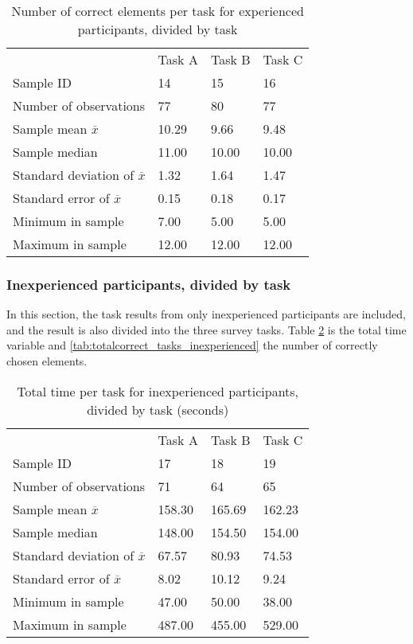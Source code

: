 \begin{table}[H]
	\centering
	\begin{tabular}{l|l|l|l}
		 & Task A & Task B & Task C \\ 
		Sample ID & 14 & 15  & 16   \\ \hline
		Number of observations & 77    & 80      &  77  \\
		Sample mean $\overline{x}$ & 10.29  &  9.66  &  9.48   \\
		Sample median & 11.00  &  10.00  &  10.00  \\
		Standard deviation of $\overline{x}$ & 1.32  & 1.64  & 1.47   \\
		Standard error of $\overline{x}$ & 0.15  & 0.18  & 0.17   \\
		Minimum in sample & 7.00 & 5.00 &  5.00 \\
		Maximum in sample  & 12.00 & 12.00  & 12.00 \\ \hline
	\end{tabular}
	\caption[Correct elements, divided by task, only inexperienced]{Number of correct elements per task for experienced participants, divided by task}
	\label{tab:totalcorrect_tasks_experienced}
\end{table}

\subsubsection{Inexperienced participants, divided by task}\label{sec:taskdivided_inexperienced}
In this section, the task results from only inexperienced participants are included, and the result is also divided into the three survey tasks. 
Table \ref{tab:totaltime_tasks_inexperienced} is the total time variable and \ref{tab:totalcorrect_tasks_inexperienced} the number of correctly chosen elements. 

\begin{table}[H]
	\centering
	\begin{tabular}{l|l|l|l}
		 & Task A & Task B & Task C \\ 
		Sample ID & 17 & 18 & 19 \\ \hline
		Number of observations & 71    & 64  & 65   \\
		Sample mean $\overline{x}$  & 158.30  &  165.69  &  162.23  \\
		Sample median & 148.00  &  154.50  &  154.00  \\
		Standard deviation of $\overline{x}$  & 67.57 & 80.93 & 74.53  \\
		Standard error of $\overline{x}$  & 8.02  & 10.12 & 9.24  \\
		Minimum in sample & 47.00 & 50.00 &  38.00 \\
		Maximum in sample & 487.00 & 455.00  & 529.00  \\ \hline
	\end{tabular}
	\caption[Total time, inexperienced per task]{Total time per task for inexperienced participants, divided by task (seconds)}
	\label{tab:totaltime_tasks_inexperienced}
\end{table}

